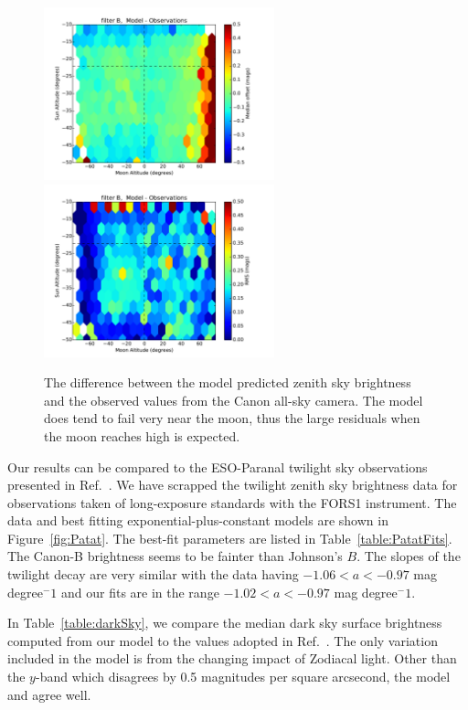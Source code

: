 \documentclass[]{spie}
\begin{document}
\begin{figure}[ht]
\begin{center}
  \includegraphics[height=5cm]{plots/zenithMedian_B_.pdf}\includegraphics[height=5cm]{plots/zenithRMS_B_.pdf}
  \end{center}
  \caption{ The difference between the model predicted zenith sky brightness and the observed values from the Canon all-sky camera.  The model does tend to fail very near the moon, thus the large residuals when the moon reaches high is expected.  \label{fig:zenithModel}}
\end{figure}


Our results can be compared to the ESO-Paranal twilight sky observations presented in Ref.~. We have scrapped the twilight zenith sky brightness data for observations taken of long-exposure standards with the FORS1 instrument.  The data and best fitting exponential-plus-constant models are shown in Figure~\ref{fig:Patat}.  The best-fit parameters are listed in Table~\ref{table:PatatFits}.  The Canon-B brightness seems to be fainter than Johnson's $B$.  The slopes of the twilight decay are very similar with the \cite{Patat06} data having $ -1.06  < a < -0.97 $ mag degree$^-1$ and our fits are in the range $ -1.02 < a < -0.97$ mag degree$^-1$.


In Table~\ref{table:darkSky}, we compare the median dark sky surface brightness computed from our model to the values adopted in Ref.~.  The only variation included in the model is from the changing impact of Zodiacal light.  Other than the $y$-band which disagrees by 0.5 magnitudes per square arcsecond, the model and \cite{Ivezic08} agree well. 
\end{document}
